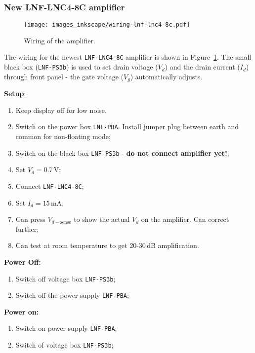 \subsubsection{New LNF-LNC4-8C amplifier}
\label{sec:new-lnf-lnc4}


\begin{figure}[h]
  \centering
  \texttt{[image: images\_inkscape/wiring-lnf-lnc4-8c.pdf]}
  \caption{\small Wiring of the amplifier. \label{fig:wiring-lnf-lnc4-8c}}
\end{figure}

The wiring for the newest \texttt{LNF-LNC4\_8C} amplifier is shown in Figure~\ref{fig:wiring-lnf-lnc4-8c}. The small black box (\texttt{LNF-PS3b}) is used to set drain voltage ($V_{d}$) and the drain current ($I_{d}$) through front panel - the gate voltage ($V_{g}$) automatically adjusts.

\textbf{Setup}:
\begin{enumerate}
\item Keep display off for low noise.
\item Switch on the power box \texttt{LNF-PBA}. Install jumper plug between earth and common for non-floating mode;
\item Switch on the black box \texttt{LNF-PS3b} - \textbf{do not connect amplifier yet!};
\item Set $V_{d}=0.7\,\text{V}$;
\item Connect \texttt{LNF-LNC4-8C};
\item Set $I_{d}=15\,\text{mA}$;
\item Can press $V_{d-\text{sense}}$ to show the actual $V_{d}$ on the amplifier. Can correct further;
  \item Can test at room temperature to get 20-30\,dB amplification.
\end{enumerate}

\textbf{Power Off:}
\begin{enumerate}
\item Switch off voltage box \texttt{LNF-PS3b};
\item Switch off the power supply \texttt{LNF-PBA};
\end{enumerate}

\textbf{Power on:}
\begin{enumerate}
\item Switch on power supply \texttt{LNF-PBA};
\item Switch of voltage box \texttt{LNF-PS3b};
\end{enumerate}

\newpage
